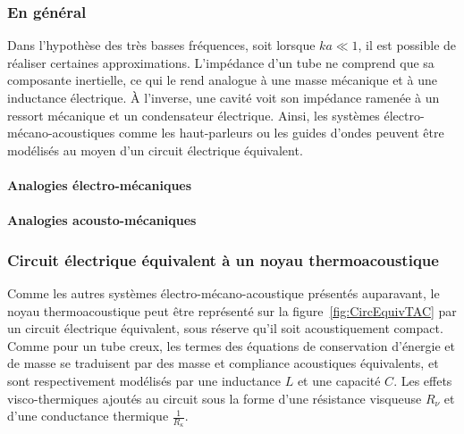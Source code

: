 \subsubsection{En général}

Dans l'hypothèse des très basses fréquences, soit lorsque $ka \ll 1$, il est possible de réaliser certaines approximations. L'impédance d'un tube ne comprend que sa composante inertielle, ce qui le rend analogue à une masse mécanique et à une inductance électrique. À l'inverse, une cavité voit son impédance ramenée à un ressort mécanique et un condensateur électrique. Ainsi, les systèmes électro-mécano-acoustiques comme les haut-parleurs ou les guides d'ondes peuvent être modélisés au moyen d'un circuit électrique équivalent. 
%
%    

\paragraph{Analogies électro-mécaniques}
 \cite{Electroac_Grains}

\paragraph{Analogies acousto-mécaniques}

\subsubsection{Circuit électrique équivalent à un noyau thermoacoustique}

Comme les autres systèmes électro-mécano-acoustique présentés auparavant, le noyau thermoacoustique peut être représenté sur la figure~\ref{fig:CircEquivTAC} par un circuit électrique équivalent, sous réserve qu'il soit acoustiquement compact. Comme pour un tube creux, les termes des équations de conservation d'énergie et de masse se traduisent par des masse et compliance acoustiques équivalents, et sont respectivement modélisés par une inductance $L$ et une capacité $C$. Les effets visco-thermiques ajoutés au circuit sous la forme d'une résistance visqueuse $R_\nu$ et d'une conductance thermique $\frac{1}{R_\kappa}$.

